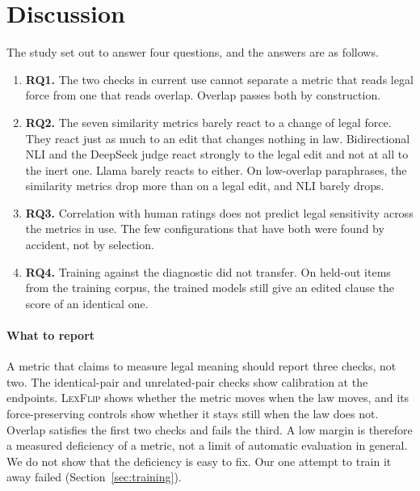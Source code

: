 \documentclass{BVP_JCLLT}
\newcommand{\rev}[1]{#1}
\newcommand{\rev}[1]{{\color{revcol}#1}}
\begin{document}
\rev{\section{Discussion}\label{sec:discussion}

The study set out to answer four questions, and the answers are as follows.

\begin{enumerate}\itemsep2pt
\item \textbf{RQ1.} The two checks in current use cannot separate a metric that
  reads legal force from one that reads overlap. Overlap passes both by
  construction.
\item \textbf{RQ2.} The seven similarity metrics barely react to a change of
  legal force. They react just as much to an edit that changes nothing in law.
  Bidirectional NLI and the DeepSeek judge react strongly to the legal edit and
  not at all to the inert one. Llama barely reacts to either. On low-overlap
  paraphrases, the similarity metrics drop more than on a legal edit, and NLI
  barely drops.
\item \textbf{RQ3.} Correlation with human ratings does not predict legal
  sensitivity across the metrics in use. The few configurations that have both
  were found by accident, not by selection.
\item \textbf{RQ4.} Training against the diagnostic did not transfer.
  On held-out items from the training corpus, the trained models still give an
  edited clause the score of an identical one.
\end{enumerate}

\paragraph{What to report}
A metric that claims to measure legal meaning should report three checks, not
two. The identical-pair and unrelated-pair checks show calibration at the
endpoints. \textsc{LexFlip} shows whether the metric moves when the law moves,
and its force-preserving controls show whether it stays still when the law does
not. Overlap satisfies the first two checks and fails the third. A low margin
is therefore a measured deficiency of a metric, not a limit of automatic
evaluation in general. We do not show that the deficiency is easy to fix. Our
one attempt to train it away failed (Section~\ref{sec:training}).

}
\end{document}
